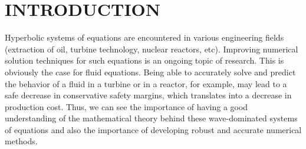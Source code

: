 %
%
%


\pagestyle{plain} %
\setcounter{page}{1}

\chapter{\uppercase {Introduction}}
Hyperbolic systems of equations are encountered in various engineering fields (extraction of oil, turbine technology, nuclear reactors, etc). Improving numerical solution techniques for such equations is an ongoing topic of research. This is obviously the case for fluid equations. Being able to accurately solve and predict the behavior of a fluid in a turbine or in a reactor, for example, may lead to a safe decrease in conservative safety margins, which translates into a decrease in production cost. Thus, we can see the importance of having a good understanding of the mathematical theory behind these wave-dominated systems of equations and also the importance of developing robust and accurate numerical methods.

